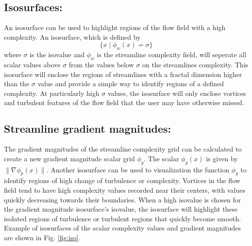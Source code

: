 \documentclass{egpubl}
\begin{document}
\subsection{Isosurfaces:} 
An isosurface can be used to highlight regions of the flow field with a high complexity.
An isosurface, which is defined by
\begin{equation} \{ x \mid \phi_w(x) = \sigma \}\end{equation}
where $\sigma$ is the isovalue and $\phi_w$ is the streamline complexity field, will seperate all scalar values above $\sigma$ from the values below $\sigma$ on the streamlines complexity.
This isosurface will enclose the regions of streamlines with a fractal dimension higher than the $\sigma$ value and provide a simple way to identify regions of a defined complexity.
At particularly high $\sigma$ values, the isosurface will only enclose vortices and turbulent features of the flow field that the user may have otherwise missed.

\subsection{Streamline gradient magnitudes:}
The gradient magnitudes of the streamline complexity grid can be calculated to create a new gradient magnitude scalar grid $\phi_g$.
The scalar $\phi_g(x)$ is given by $\| \nabla \phi_p(x) \|$.
Another isosurface can be used to visualization the function $\phi_g$ to identify regions of high change of turbulence or complexity.
Vortices in the flow field tend to have high complexity values recorded near their centers, with values quickly decreasing towards their boundaries.
When a high isovalue is chosen for the gradient magnitude isosurface's isovalue, the isosurface will highlight these isolated regions of turbulence or turbulent regions that quickly become smooth.
Example of isosurfaces of the scalar complexity values and gradient magnitudes are shown in Fig. \ref{fig:iso}.
\end{document}
